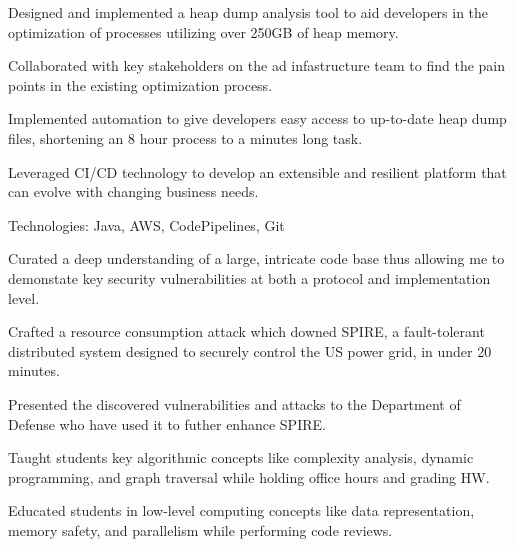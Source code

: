 \documentclass[]{deedy-resume-openfont}
\begin{document}
\qquad\qquad\qquad\qquad\quad {}
\begin{tightemize}
    \item Designed and implemented a heap dump analysis tool to aid developers in the
    optimization of processes utilizing over 250GB of heap memory.
    \item Collaborated with key stakeholders on the ad infastructure team
    to find the pain points in the existing optimization process.
    \item Implemented automation to give developers easy access to up-to-date 
    heap dump files, shortening an 8 hour process to a minutes long task.
    \item Leveraged CI/CD technology to develop an extensible
    and resilient platform that can evolve with changing business needs.
    \item Technologies: Java, AWS, CodePipelines, Git
    \end{tightemize}
\sectionsep

 \href{http://www.dsn.jhu.edu/courses/cs310/power-grid/}{\faExternalLink}
\begin{tightemize}
    \item Curated a deep understanding of a large, intricate code base thus allowing me
    to demonstate key security vulnerabilities at both a protocol and implementation level.
    \item Crafted a resource consumption attack which downed SPIRE, a fault-tolerant 
    distributed system designed to securely control the US power grid, in under 20 minutes.
    \item Presented the discovered vulnerabilities and attacks to the Department of Defense
    who have used it to futher enhance SPIRE.
\end{tightemize}
\sectionsep

\qquad \quad {}
\begin{tightemize}
    \item Taught students key algorithmic concepts like complexity analysis, 
    dynamic programming, and graph traversal while holding office hours and grading HW.
    \item Educated students in low-level computing concepts like data representation, 
    memory safety, and parallelism while performing code reviews.
\end{tightemize}
\sectionsep
\end{document}
